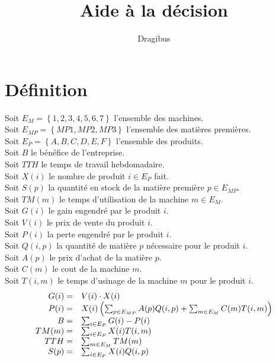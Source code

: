 \documentclass[a4paper, 11pt]{article}
\title{Aide à la décision}
\author{Dragibus}
\date{}
\begin{document}
\maketitle
\tableofcontents
\newpage

\section{Définition}
Soit $E_M = \left\{1, 2, 3, 4, 5, 6, 7\right\} $ l'ensemble des machines. \\
Soit $E_{MP} = \left\{MP1, MP2, MP3\right\} $ l'ensemble des matières premières. \\
Soit $E_P = \left\{A, B, C, D, E, F\right\} $ l'ensemble des produits. \\
Soit $B$ le bénéfice de l'entreprise. \\
Soit $TTH$ le temps de travail hebdomadaire. \\
Soit $X(i)$ le nombre de produit $i\in E_P$ fait. \\
Soit $S(p)$ la quantité en stock de la matière première $p\in E_{MP}$. \\
Soit $TM(m)$ le temps d'utilisation de la machine $m\in E_M$.\\
Soit $G(i)$ le gain engendré par le produit $i$. \\
Soit $V(i)$ le prix de vente du produit $i$. \\
Soit $P(i)$ la perte engendré par le produit $i$. \\
Soit $Q(i, p)$ la quantité de matière $p$ nécessaire pour le produit $i$. \\
Soit $A(p)$ le prix d'achat de la matière $p$. \\
Soit $C(m)$ le cout de la machine $m$. \\
Soit $T(i, m)$ le temps d'usinage de la machine $m$ pour le produit $i$. \\

$$
\begin{array}{r l}
    G(i) =  & V(i)\cdot X(i) \\
    P(i) =  & X(i)\left(\sum_{p\in E_{MP}} A(p)Q(i, p)+ \sum_{m\in E_M} C(m)T(i, m)\right) \\
    B =     & \sum_{i\in E_P} G(i) - P(i) \\
    TM(m) = & \sum_{i\in E_P} X(i)T(i, m) \\
    TTH =   & \sum_{m\in E_M} TM(m) \\
    S(p) =  & \sum_{i\in E_P} X(i)Q(i, p) \\
\end{array}
$$
\end{document}
